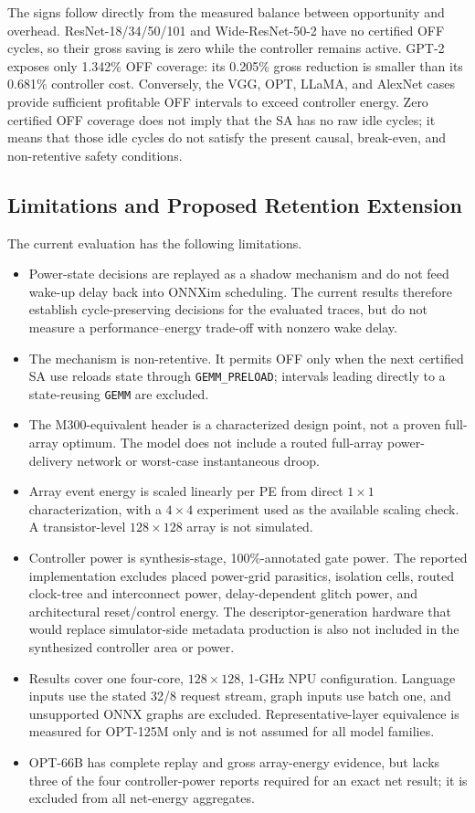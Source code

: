 The signs follow directly from the measured balance between opportunity and
overhead.  ResNet-18/34/50/101 and Wide-ResNet-50-2 have no certified OFF
cycles, so their gross saving is zero while the controller remains active.
GPT-2 exposes only 1.342\% OFF coverage: its 0.205\% gross reduction is smaller
than its 0.681\% controller cost.  Conversely, the VGG, OPT, LLaMA, and AlexNet
cases provide sufficient profitable OFF intervals to exceed controller
energy.  Zero certified OFF coverage does not imply that the SA has no raw
idle cycles; it means that those idle cycles do not satisfy the present
causal, break-even, and non-retentive safety conditions.

\subsection{Limitations and Proposed Retention Extension}
\label{sec:limitations-retention}

The current evaluation has the following limitations.
\begin{itemize}
  \item Power-state decisions are replayed as a shadow mechanism and do not
  feed wake-up delay back into ONNXim scheduling.  The current results
  therefore establish cycle-preserving decisions for the evaluated traces,
  but do not measure a performance--energy trade-off with nonzero wake delay.
  \item The mechanism is non-retentive.  It permits OFF only when the next
  certified SA use reloads state through \texttt{GEMM\_PRELOAD}; intervals
  leading directly to a state-reusing \texttt{GEMM} are excluded.
  \item The M300-equivalent header is a characterized design point, not a
  proven full-array optimum.  The model does not include a routed full-array
  power-delivery network or worst-case instantaneous droop.
  \item Array event energy is scaled linearly per PE from direct $1\times1$
  characterization, with a $4\times4$ experiment used as the available
  scaling check.  A transistor-level $128\times128$ array is not simulated.
  \item Controller power is synthesis-stage, 100\%-annotated gate power.  The
  reported implementation excludes placed power-grid parasitics, isolation
  cells, routed clock-tree and interconnect power, delay-dependent glitch
  power, and architectural reset/control energy.  The descriptor-generation
  hardware that would replace simulator-side metadata production is also not
  included in the synthesized controller area or power.
  \item Results cover one four-core, $128\times128$, 1-GHz NPU configuration.
  Language inputs use the stated 32/8 request stream, graph inputs use batch
  one, and unsupported ONNX graphs are excluded.  Representative-layer
  equivalence is measured for OPT-125M only and is not assumed for all model
  families.
  \item OPT-66B has complete replay and gross array-energy evidence, but lacks
  three of the four controller-power reports required for an exact net result;
  it is excluded from all net-energy aggregates.
\end{itemize}

